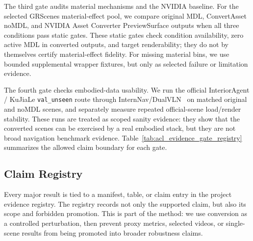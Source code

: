 The third gate audits material mechanisms and the NVIDIA baseline. For the
selected GRScenes material-effect pool, we compare original MDL, ConvertAsset
noMDL, and NVIDIA Asset Converter PreviewSurface outputs when all three
conditions pass static gates. These static gates check condition availability,
zero active MDL in converted outputs, and target renderability; they do not by
themselves certify material-effect fidelity. For missing material bins, we use
bounded supplemental wrapper fixtures, but only as selected failure or
limitation evidence.

The fourth gate checks embodied-data usability. We run the official
InteriorAgent / KuJiaLe \texttt{val\_unseen} route through
InternNav/DualVLN~\cite{Wei2026Ground} on matched original and noMDL scenes,
and separately measure repeated official-scene load/render stability. These
runs are treated as scoped sanity evidence: they show that the converted scenes
can be exercised by a real embodied stack, but they are not broad navigation
benchmark evidence.
Table~\ref{tab:acl_evidence_gate_registry} summarizes the allowed claim
boundary for each gate.



\subsection{Claim Registry}
\label{sec:claim_registry}

Every major result is tied to a manifest, table, or claim entry in the project
evidence registry. The registry records not only the supported claim, but also
its scope and forbidden promotion. This is part of the method: we use conversion
as a controlled perturbation, then prevent proxy metrics, selected videos, or
single-scene results from being promoted into broader robustness claims.
